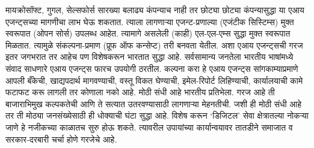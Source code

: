 मायक्रोसॉफ्ट, गुगल, सेल्सफोर्स सारख्या बलाढ्य कंपन्याच नाही तर छोट्या छोट्या कंपन्यासुद्धा या एआय एजन्ट्सच्या मागणीचा लाभ घेऊ शकतात. त्याला लागणाऱ्या एजन्ट-प्रणाल्या (एजंटीक सिस्टिम्स) मुक्त स्वरूपात (ओपन सोर्स) उपलब्ध आहेत. त्यामागे असलेली (काही)  एल-एल-एम्स सुद्धा मुक्त स्वरूपात मिळतात. त्यामुळे संकल्पना-प्रमाण (प्रूफ ऑफ कन्सेप्ट) तरी बनवता येतील. अशा एआय एजन्ट्सची गरज इतर जगभरात तर आहेच पण विशेषकरून भारतात सुद्धा आहे. सर्वसामान्य जनतेला भारतीय भाषांमध्ये संवाद साधणारे एआय एजन्ट्स  फारच उपयोगी ठरतील. कल्पना करा हे एआय एजन्ट्स सांगकाम्याप्रमाणे आपली बँकेची, खाद्यपदार्थ मागवण्याची, वस्तू विकत घेण्याची, इमेल-रिपोर्ट लिहिण्याची, कार्यालयाची कामे फटाफट करू लागली तर कोणाला नको आहे. मोठी संधी आहे भारतीय प्रतिभेला. गरज आहे ती बाजाराभिमुख कल्पकतेची आणि ते सत्यात उतरवण्यासाठी लागणाऱ्या मेहनतीची. जशी ही मोठी संधी आहे तर ती मोठ्या जनसंख्येसाठी ही धोक्याची घंटा सुद्धा आहे. विशेष करून ‘डिजिटल’ सेवा क्षेत्रातल्या नोकऱ्या जाणे हे नजीकच्या काळातच सुरु होऊ शकते.  त्यावरील उपायांच्या कार्यान्वयावर तातडीने समाजात व सरकार-दरबारी चर्चा होणे गरजेचे आहे. 